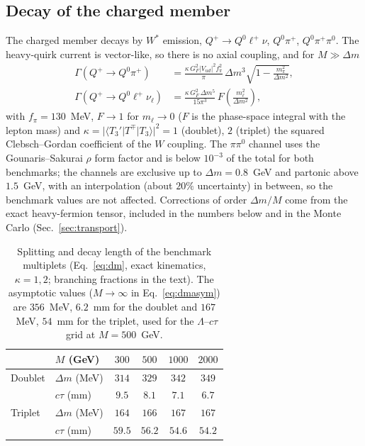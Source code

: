 \documentclass[prd,twocolumn,nofootinbib,superscriptaddress,amsmath,amssymb]{revtex4-2}
\begin{document}
\subsection{Decay of the charged member}
The charged member decays by $W^*$ emission, $Q^+\to Q^0\ell^+\nu$, $Q^0\pi^+$, $Q^0\pi^+\pi^0$. The heavy-quirk current is vector-like, so there is no axial coupling, and for $M\gg\Delta m$
\begin{align}
\Gamma(Q^+\!\to Q^0\pi^+) &= \frac{\kappa\,G_F^2|V_{ud}|^2f_\pi^2}{\pi}\,\Delta m^3\sqrt{1-\frac{m_\pi^2}{\Delta m^2}},\\
\Gamma(Q^+\!\to Q^0\ell^+\nu_\ell) &= \frac{\kappa\,G_F^2\,\Delta m^5}{15\pi^3}\,F\!\left(\frac{m_\ell^2}{\Delta m^2}\right),
\end{align}
with $f_\pi=130$~MeV, $F\to1$ for $m_\ell\to0$ ($F$ is the phase-space integral with the lepton mass) and $\kappa=|\langle T_3'|T^\mp|T_3\rangle|^2=1$ (doublet), $2$ (triplet) the squared Clebsch--Gordan coefficient of the $W$ coupling. The $\pi\pi^0$ channel uses the Gounaris--Sakurai $\rho$ form factor and is below $10^{-3}$ of the total for both benchmarks; the channels are exclusive up to $\Delta m=0.8$~GeV and partonic above $1.5$~GeV, with an interpolation (about $20\%$ uncertainty) in between, so the benchmark values are not affected. Corrections of order $\Delta m/M$ come from the exact heavy-fermion tensor, included in the numbers below and in the Monte Carlo (Sec.~\ref{sec:transport}).

\begin{table}[t]
\caption{Splitting and decay length of the benchmark multiplets (Eq.~\ref{eq:dm}, exact kinematics, $\kappa=1,2$; branching fractions in the text). The asymptotic values ($M\to\infty$ in Eq.~\ref{eq:dmasym}) are $356$~MeV, $6.2$~mm for the doublet and $167$~MeV, $54$~mm for the triplet, used for the $\Lambda$--$c\tau$ grid at $M=500$~GeV.}
\label{tab:model}
\begin{ruledtabular}
\begin{tabular}{llcccc}
 & $M$ (GeV) & $300$ & $500$ & $1000$ & $2000$\\
\hline
Doublet & $\Delta m$ (MeV) & $314$ & $329$ & $342$ & $349$\\
        & $c\tau$ (mm) & $9.5$ & $8.1$ & $7.1$ & $6.7$\\
Triplet & $\Delta m$ (MeV) & $164$ & $166$ & $167$ & $167$\\
        & $c\tau$ (mm) & $59.5$ & $56.2$ & $54.6$ & $54.2$\\
\end{tabular}
\end{ruledtabular}
\end{table}
\end{document}
